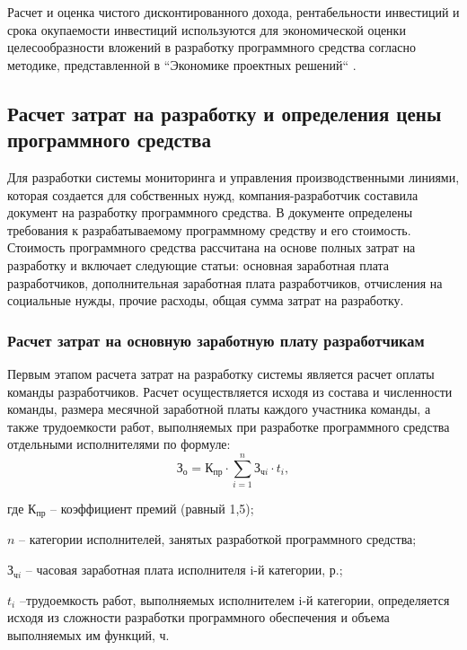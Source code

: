 Расчет и оценка чистого дисконтированного дохода, рентабельности инвестиций и срока окупаемости инвестиций используются для экономической оценки целесообразности вложений в разработку программного средства согласно методике, представленной в ``Экономике проектных решений`` \cite{Economics}.

\subsection{Расчет затрат на разработку и определения цены программного средства}

Для разработки системы мониторинга и управления производственными линиями, которая создается для собственных нужд, компания-разработчик составила документ на разработку программного средства. В документе определены требования к разрабатываемому программному средству и его стоимость. Стоимость программного средства рассчитана на основе полных затрат на разработку и включает следующие статьи: основная заработная плата разработчиков, дополнительная заработная плата разработчиков, отчисления на социальные нужды, прочие расходы, общая сумма затрат на разработку.

\subsubsection{Расчет затрат на основную заработную плату разработчикам}
Первым этапом расчета затрат на разработку системы является расчет оплаты команды разработчиков. 
Расчет осуществляется исходя из состава и численности команды, размера месячной заработной платы каждого участника команды, а также трудоемкости работ, выполняемых при разработке программного средства отдельными исполнителями по формуле:
\begin{equation}
    \mbox{З}_{\mbox{о}}=\mbox{К}_{\mbox{пр}}\cdot \sum_{i=1}^{n}{\mbox{З}_{\mbox{ч}i}\cdot t_{i}},
\end{equation}



    где	$\mbox{К}_{\mbox{пр}}$ -- коэффициент премий (равный 1,5); 
    
    $n$ -- категории исполнителей, занятых разработкой программного средства;
    
    $\mbox{З}_{\mbox{ч}i}$ -- часовая заработная плата исполнителя i-й категории, р.; 
    
    $t_{i}$ --трудоемкость работ, выполняемых исполнителем i-й категории, определяется исходя из сложности разработки программного обеспечения и объема выполняемых им функций, ч.
    


